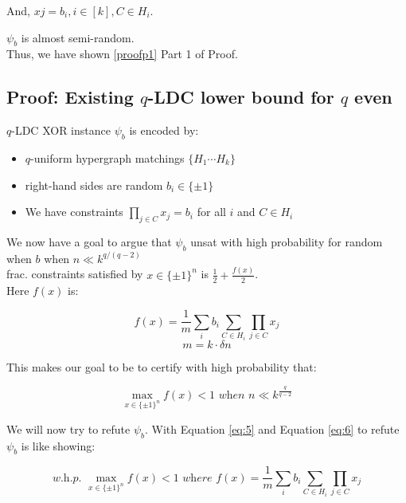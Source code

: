 \documentclass{article}
\begin{document}
\noindent And, $xj = b_i, i \in [k], C \in H_i$.

\noindent $\psi_b$ is almost semi-random.\\

\noindent Thus, we have shown \ref{proofp1}{ Part 1 of Proof}.

\subsection{Proof: Existing $q$-LDC lower bound for $q$ even}

$q$-LDC XOR instance $\psi_b$ is encoded by:

\begin{itemize}
    \item $q$-uniform hypergraph matchings $\{ H_1 \cdots H_k \}$
    \item right-hand sides are random $b_i \in \{ \pm 1 \}$
    \item We have constraints $\displaystyle\prod_{j \in C} x_j=b_i$ for all $i$ and $C \in H_i$
\end{itemize}

\noindent We now have a goal to argue that $\psi_b$ unsat with high probability for random when $b$ when $n \ll k^{q/(q-2)}$\\

\noindent frac. constraints satisfied by $x \in \{ \pm 1 \}^n$ is $\frac{1}{2} + \frac{f(x)}{2}$.\\

\noindent Here $f(x)$ is:

\begin{equation}\label{eq:5}
f(x) = \frac{1}{m} \sum_{i} b_i \sum_{C \in H_i} \prod_{j \in C} x_j
\end{equation}
\begin{equation*}
m = k \cdot \delta n
\end{equation*}

\noindent This makes our goal to be to certify with high probability that:

\begin{equation}\label{eq:6}
\max_{x \in \{ \pm 1 \}^n} f(x) < 1 \textit{ when } n \ll k^{\frac{q}{q-2}}
\end{equation}

\noindent We will now try to refute $\psi_b$. With Equation \ref{eq:5} and Equation \ref{eq:6} to refute $\psi_b$ is like showing:

\begin{equation}
\textit{w.h.p. } \max_{x \in \{ \pm 1 \}^n} f(x) < 1 \textit{ where } f(x) = \frac{1}{m} \sum_{i} b_i \sum_{C \in H_i} \prod_{j \in C} x_j
\end{equation}
\end{document}
